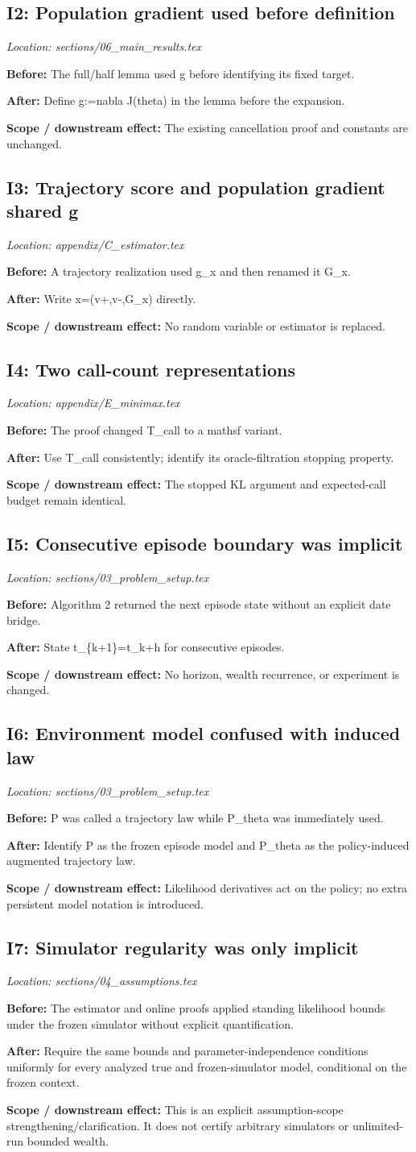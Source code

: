 \documentclass[10pt]{article}
\newcommand{\before}[1]{\par\noindent\textcolor{before}{\textbf{Before:}} #1\par}
\newcommand{\after}[1]{\par\noindent\textcolor{after}{\textbf{After:}} #1\par}
\newcommand{\scope}[1]{\par\noindent\textcolor{scope}{\textbf{Scope / downstream effect:}} #1\par}
\begin{document}
\subsection*{I2: Population gradient used before definition}
\noindent\textit{Location: sections/06\_main\_results.tex}
\before{The full/half lemma used g before identifying its fixed target.}
\after{Define g:=nabla J(theta) in the lemma before the expansion.}
\scope{The existing cancellation proof and constants are unchanged.}
\subsection*{I3: Trajectory score and population gradient shared g}
\noindent\textit{Location: appendix/C\_estimator.tex}
\before{A trajectory realization used g\_x and then renamed it G\_x.}
\after{Write x=(v+,v-,G\_x) directly.}
\scope{No random variable or estimator is replaced.}
\subsection*{I4: Two call-count representations}
\noindent\textit{Location: appendix/E\_minimax.tex}
\before{The proof changed T\_call to a mathsf variant.}
\after{Use T\_call consistently; identify its oracle-filtration stopping property.}
\scope{The stopped KL argument and expected-call budget remain identical.}
\subsection*{I5: Consecutive episode boundary was implicit}
\noindent\textit{Location: sections/03\_problem\_setup.tex}
\before{Algorithm 2 returned the next episode state without an explicit date bridge.}
\after{State t\_\{k+1\}=t\_k+h for consecutive episodes.}
\scope{No horizon, wealth recurrence, or experiment is changed.}
\subsection*{I6: Environment model confused with induced law}
\noindent\textit{Location: sections/03\_problem\_setup.tex}
\before{P was called a trajectory law while P\_theta was immediately used.}
\after{Identify P as the frozen episode model and P\_theta as the policy-induced augmented trajectory law.}
\scope{Likelihood derivatives act on the policy; no extra persistent model notation is introduced.}
\subsection*{I7: Simulator regularity was only implicit}
\noindent\textit{Location: sections/04\_assumptions.tex}
\before{The estimator and online proofs applied standing likelihood bounds under the frozen simulator without explicit quantification.}
\after{Require the same bounds and parameter-independence conditions uniformly for every analyzed true and frozen-simulator model, conditional on the frozen context.}
\scope{This is an explicit assumption-scope strengthening/clarification. It does not certify arbitrary simulators or unlimited-run bounded wealth.}
\end{document}
